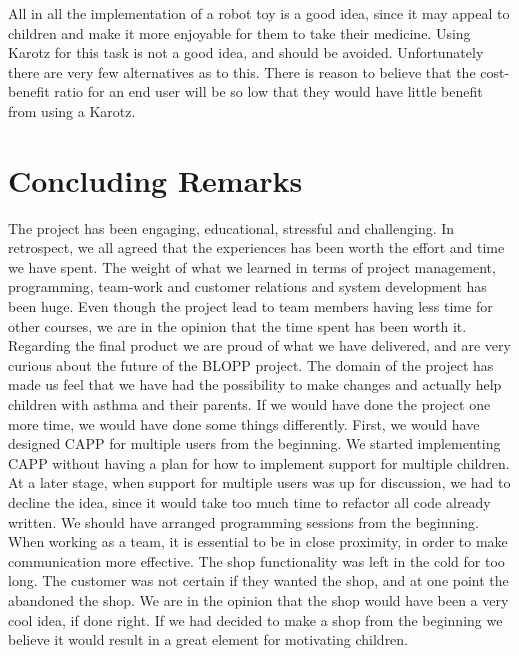 All in all the implementation of a robot toy is a good idea, since it may appeal to children and make it more enjoyable for them to take their medicine. Using Karotz for this task is not a good idea, and should be avoided. Unfortunately there are very few alternatives as to this. There is reason to believe that the cost-benefit ratio for an end user will be so low that they would have little benefit from using a Karotz. 


\clearpage{} %

\section{Concluding Remarks}
\label{sec:concludingremarks}
The project has been engaging, educational, stressful and challenging. In retrospect, we all agreed that the experiences has been worth the effort and time we have spent. The weight of what we learned in terms of project management, programming, team-work and customer relations and system development has been huge. Even though the project lead to team members having less time for other courses, we are in the opinion that the time spent has been worth it. 
Regarding the final product we are proud of what we have delivered, and are very curious about the future of the BLOPP project. The domain of the project has made us feel that we have had the possibility to make changes and actually help children with asthma and their parents.
If we would have done the project one more time, we would have done some things differently. 
First, we would have designed CAPP for multiple users from the beginning. We started implementing CAPP without having a plan for how to implement support for multiple children. At a later stage, when support for multiple users was up for discussion, we had to decline the idea, since it would take too much time to refactor all code already written. 
We should have arranged programming sessions from the beginning. When working as a team, it is essential to be in close proximity, in order to make communication more effective.
The shop functionality was left in the cold for too long. The customer was not certain if they wanted the shop, and at one point the abandoned the shop. We are in the opinion that the shop would have been a very cool idea, if done right. If we had decided to make a shop from the beginning we believe it would result in a great element for motivating children.